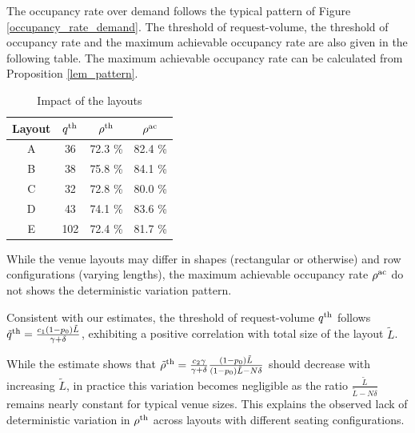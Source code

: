 The occupancy rate over demand follows the typical pattern of Figure \ref{occupancy_rate_demand}. The threshold of request-volume, the threshold of occupancy rate and the maximum achievable occupancy rate are also given in the following table. The maximum achievable occupancy rate can be calculated from Proposition \ref{lem_pattern}.

\begin{table}[ht]
  \centering
  \caption{Impact of the layouts}
  \begin{tabular}{cccc}
  \hline
  \hline
   Layout & $q^{\textup{th}}$ & $\rho^{\textup{th}}$ & $\rho^{\textup{ac}}$ \\
  \hline
   A & 36 & 72.3 \% & 82.4 \% \\
   B & 38 & 75.8 \% & 84.1 \% \\
   C & 32 & 72.8 \% & 80.0 \% \\
   D & 43 & 74.1 \%  & 83.6 \% \\
   E & 102 & 72.4 \% & 81.7 \% \\
   \hline
   \hline
  \end{tabular}
\end{table}

While the venue layouts may differ in shapes (rectangular or otherwise) and row configurations (varying lengths), the maximum achievable occupancy rate $\rho^{\textup{ac}}$ do not shows the deterministic variation pattern.

Consistent with our estimates, the threshold of request-volume $q^{\textup{th}}$ follows $\tilde{q}^{\textup{th}} =  \frac{c_1 (1-p_0) \tilde{L}}{\gamma + \delta}$, exhibiting a positive correlation with total size of the layout $\tilde{L}$. 

While the estimate shows that $\tilde{\rho}^{\textup{th}} = \frac{c_2 \gamma}{\gamma +\delta} \frac{(1-p_0) \tilde{L}}{(1-p_0) \tilde{L}-N \delta}$ should decrease with increasing $\tilde{L}$, in practice this variation becomes negligible as the ratio $\frac{\tilde{L}}{\tilde{L}-N\delta}$ remains nearly constant for typical venue sizes. This explains the observed lack of deterministic variation in 
$\rho^{\textup{th}}$ across layouts with different seating configurations.




